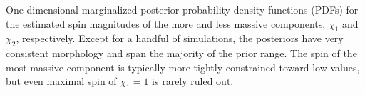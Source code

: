 \label{fig:spinPDF} One-dimensional marginalized posterior probability density functions (PDFs) for the estimated spin magnitudes of the more and less massive components, $\chi_1$ and $\chi_2$, respectively. Except for a handful of simulations, the posteriors have very consistent morphology and span the majority of the prior range.  The spin of the most massive component is typically more tightly constrained toward low values, but even maximal spin of $\chi_1 = 1$ is rarely ruled out.
  
  